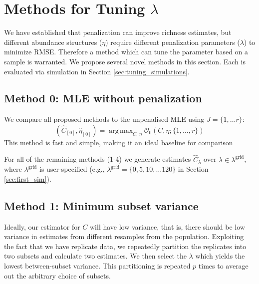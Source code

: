\documentclass[oupdraft]{bio}
\DeclareMathOperator*{\argmax}{arg\,max}
\newcommand{\lambdagrid}{\lambda^{\text{grid}}}
\begin{document}
%
%
%
\section{Methods for Tuning $\lambda$}
\label{sec:tuning_proposals}

We have established that penalization can improve richness estimates, but different abundance structures ($\eta$) require different penalization parameters ($\lambda$) to minimize RMSE.  Therefore a method which can tune the parameter based on a sample is warranted.  We propose several novel methods in this section.  Each is evaluated via simulation in Section \ref{sec:tuning_simulations}.

\setcounter{subsection}{-1}
\subsection{Method 0: MLE without penalization}

We compare all proposed methods to the unpenalised MLE using $J = \{1, \dots r \}$:
\begin{equation}
\left(\widehat{C}_{[0]},  \widehat{\eta}_{[0]} \right) = \argmax_{C, \, \eta}  \mathcal{O}_{0}\left(C, \eta ; \{1, \dots , r\} \right) \label{eq:c_hat_0}
\end{equation}
This method is fast and simple, making it an ideal baseline for comparison

For all of the remaining methods (1-4) we generate estimates $\widehat{C}_\lambda$ over $\lambda \in \lambda^{\text{grid}}$, where $\lambdagrid$ is user-specified (e.g., $\lambdagrid = \{0, 5, 10, \dots 120\}$ in Section \ref{sec:first_sim}).  %

%
%
\subsection{Method 1: Minimum subset variance}

Ideally, our estimator for $C$ will have low variance, that is, there should be low variance in estimates from different resamples from the population.
Exploiting the fact that we have replicate data, we repeatedly partition the replicates into two subsets and calculate two estimates.  We then select the $\lambda$ which yields the lowest between-subset variance.  This partitioning is repeated $p$ times to average out the arbitrary choice of subsets.
\end{document}
